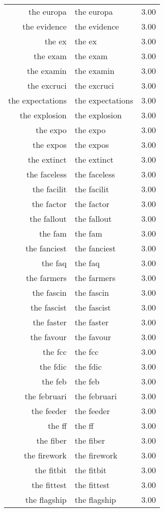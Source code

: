 \begin{table}[ht]
\begin{tabular}{rlr}
  the europa & the europa & 3.00 \\ 
  the evidence & the evidence & 3.00 \\ 
  the ex & the ex & 3.00 \\ 
  the exam & the exam & 3.00 \\ 
  the examin & the examin & 3.00 \\ 
  the excruci & the excruci & 3.00 \\ 
  the expectations & the expectations & 3.00 \\ 
  the explosion & the explosion & 3.00 \\ 
  the expo & the expo & 3.00 \\ 
  the expos & the expos & 3.00 \\ 
  the extinct & the extinct & 3.00 \\ 
  the faceless & the faceless & 3.00 \\ 
  the facilit & the facilit & 3.00 \\ 
  the factor & the factor & 3.00 \\ 
  the fallout & the fallout & 3.00 \\ 
  the fam & the fam & 3.00 \\ 
  the fanciest & the fanciest & 3.00 \\ 
  the faq & the faq & 3.00 \\ 
  the farmers & the farmers & 3.00 \\ 
  the fascin & the fascin & 3.00 \\ 
  the fascist & the fascist & 3.00 \\ 
  the faster & the faster & 3.00 \\ 
  the favour & the favour & 3.00 \\ 
  the fcc & the fcc & 3.00 \\ 
  the fdic & the fdic & 3.00 \\ 
  the feb & the feb & 3.00 \\ 
  the februari & the februari & 3.00 \\ 
  the feeder & the feeder & 3.00 \\ 
  the ff & the ff & 3.00 \\ 
  the fiber & the fiber & 3.00 \\ 
  the firework & the firework & 3.00 \\ 
  the fitbit & the fitbit & 3.00 \\ 
  the fittest & the fittest & 3.00 \\ 
  the flagship & the flagship & 3.00 \\ 

\end{tabular}
\end{table}
